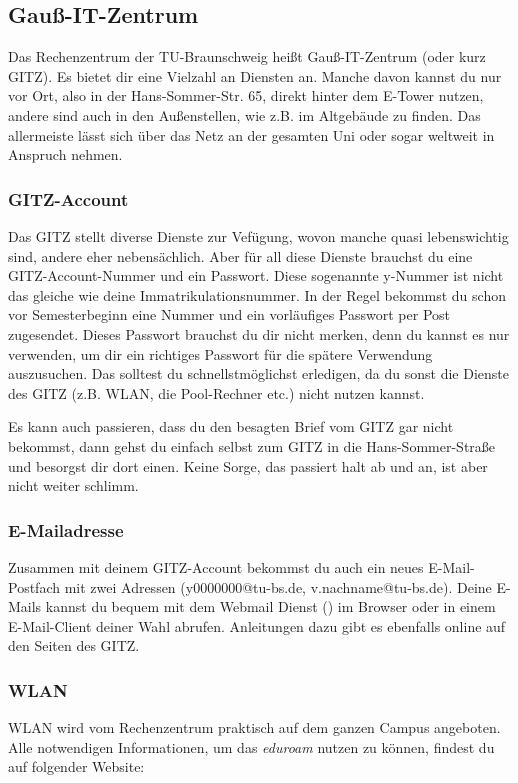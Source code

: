
\subsection{Gauß-IT-Zentrum}

	Das Rechenzentrum der TU-Braunschweig heißt Gauß-IT-Zentrum (oder kurz GITZ). Es bietet dir eine Vielzahl an Diensten an. Manche davon kannst du nur vor Ort, also in der Hans-Sommer-Str. 65, direkt hinter dem E-Tower nutzen, andere sind auch in den Außenstellen, wie z.B. im Altgebäude zu finden. Das allermeiste lässt sich über das Netz an der gesamten Uni oder sogar weltweit in Anspruch nehmen.

\subsubsection{GITZ-Account}
\label{todogitz}
	Das GITZ stellt diverse Dienste zur Vefügung, wovon manche quasi lebenswichtig sind, andere eher nebensächlich. Aber für all diese Dienste brauchst du eine GITZ-Account-Nummer und ein Passwort. Diese sogenannte y-Nummer ist nicht das gleiche wie deine Immatrikulationsnummer. In der Regel bekommst du schon vor Semesterbeginn eine Nummer und ein vorläufiges Passwort per Post zugesendet. Dieses Passwort brauchst du dir nicht merken, denn du kannst es nur verwenden, um dir ein richtiges Passwort für die spätere Verwendung auszusuchen. Das solltest du schnellstmöglichst erledigen, da du sonst die Dienste des GITZ (z.B. WLAN, die Pool-Rechner etc.) nicht nutzen kannst.
	
	Es kann auch passieren, dass du den besagten Brief vom GITZ  gar nicht bekommst, dann gehst du einfach selbst zum GITZ in die Hans-Sommer-Straße und besorgst dir dort einen. Keine Sorge, das passiert halt ab und an, ist aber nicht weiter schlimm.

	\subsubsection{E-Mailadresse}
		Zusammen mit deinem GITZ-Account bekommst du auch ein neues E-Mail-Postfach mit zwei Adressen (y0000000@tu-bs.de, v.nachname@tu-bs.de). Deine E-Mails kannst du bequem mit dem Webmail Dienst () im Browser oder in einem E-Mail-Client deiner Wahl abrufen. Anleitungen dazu gibt es ebenfalls online auf den Seiten des GITZ.

	\subsubsection{WLAN}
		\label{wlan}
		WLAN wird vom Rechenzentrum praktisch auf dem ganzen Campus angeboten. Alle notwendigen Informationen, um das \emph{eduroam} nutzen zu können, findest du auf folgender Website: 

